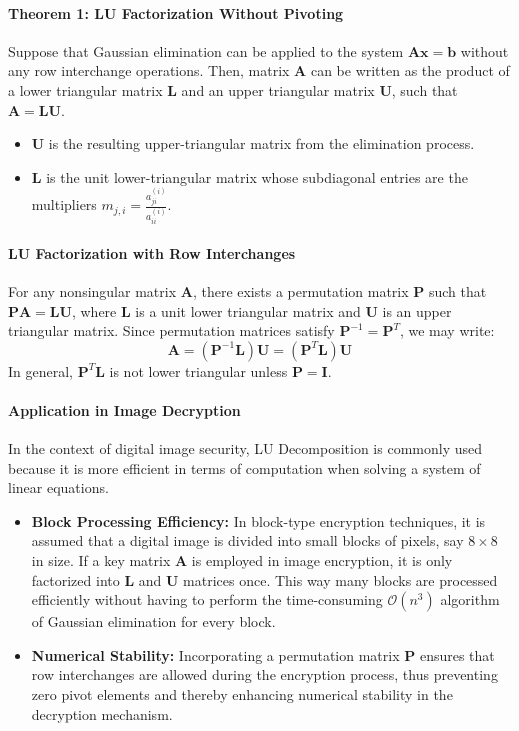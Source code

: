 \documentclass[11pt]{article}
\begin{document}
\paragraph{Theorem 1: LU Factorization Without Pivoting}
Suppose that Gaussian elimination can be applied to the system $\mathbf{A}\mathbf{x}=\mathbf{b}$ without any row interchange operations. Then, matrix $\mathbf{A}$ can be written as the product of a lower triangular matrix $\mathbf{L}$ and an upper triangular matrix $\mathbf{U}$, such that $\mathbf{A}=\mathbf{L}\mathbf{U}$.
\begin{itemize}
    \item $\mathbf{U}$ is the resulting upper-triangular matrix from the elimination process.
    \item $\mathbf{L}$ is the unit lower-triangular matrix whose subdiagonal entries are the multipliers $m_{j,i}=\frac{a_{ji}^{(i)}}{a_{ii}^{(i)}}$.
\end{itemize}

\paragraph{LU Factorization with Row Interchanges}
For any nonsingular matrix $\mathbf{A}$, there exists a permutation matrix $\mathbf{P}$ such that $\mathbf{P}\mathbf{A} = \mathbf{L}\mathbf{U}$, where $\mathbf{L}$ is a unit lower triangular matrix and $\mathbf{U}$ is an upper triangular matrix. Since permutation matrices satisfy $\mathbf{P}^{-1} = \mathbf{P}^T$, we may write:
$$ \mathbf{A} = (\mathbf{P}^{-1} \mathbf{L})\mathbf{U} = (\mathbf{P}^T \mathbf{L})\mathbf{U} $$
In general, $\mathbf{P}^T \mathbf{L}$ is not lower triangular unless $\mathbf{P}=\mathbf{I}$.

\paragraph{Application in Image Decryption}
In the context of digital image security, LU Decomposition is commonly used because it is more efficient in terms of computation when solving a system of linear equations.
\begin{itemize}
    \item \textbf{Block Processing Efficiency:} In block-type encryption techniques, it is assumed that a digital image is divided into small blocks of pixels, say $8 \times 8$ in size. If a key matrix $\mathbf{A}$ is employed in image encryption, it is only factorized into $\mathbf{L}$ and $\mathbf{U}$ matrices once. This way many blocks are processed efficiently without having to perform the time-consuming $\mathcal{O}(n^3)$ algorithm of Gaussian elimination for every block.
    \item \textbf{Numerical Stability:} Incorporating a permutation matrix $\mathbf{P}$ ensures that row interchanges are allowed during the encryption process, thus preventing zero pivot elements and thereby enhancing numerical stability in the decryption mechanism.
\end{itemize}
\end{document}
